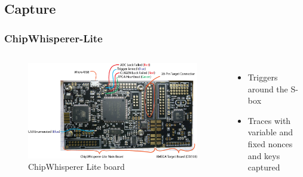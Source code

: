 \documentclass{beamer}
\begin{document}
	\subsection{Capture}
	\begin{frame}
		\frametitle{ChipWhisperer-Lite}
		\begin{columns}
			\begin{figure}[h]
				\includegraphics[width=\textwidth]{cwlite_basic1}
				\caption{ChipWhisperer Lite board}
				\label{fig:cw}
			\end{figure}
			
			\begin{itemize}
				\item Triggers around the S-box
				\item Traces with variable and fixed nonces  and keys captured
			\end{itemize}
		\end{columns}
	\end{frame}
	
\end{document}
